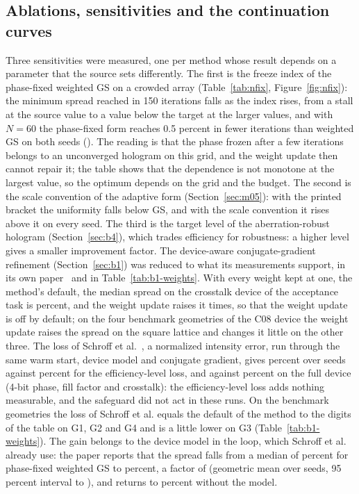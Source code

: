 \subsection{Ablations, sensitivities and the continuation curves}\label{sec:results-ablation}

Three sensitivities were measured, one per method whose result depends on a parameter that the source sets differently. The first is the freeze index of the phase-fixed weighted GS on a crowded array (Table~\ref{tab:nfix}, Figure~\ref{fig:nfix}): the minimum spread reached in 150 iterations falls as the index rises, from a stall at the source value to a value below the target at the larger values, and with $N=60$ the phase-fixed form reaches 0.5 percent in fewer iterations than weighted GS on both seeds (). The reading is that the phase frozen after a few iterations belongs to an unconverged hologram on this grid, and the weight update then cannot repair it; the table shows that the dependence is not monotone at the largest value, so the optimum depends on the grid and the budget. The second is the scale convention of the adaptive form (Section~\ref{sec:m05}): with the printed bracket the uniformity falls below GS, and with the scale convention it rises above it on every seed. The third is the target level of the aberration-robust hologram (Section~\ref{sec:b4}), which trades efficiency for robustness: a higher level gives a smaller improvement factor. The device-aware conjugate-gradient refinement (Section~\ref{sec:b1}) was reduced to what its measurements support, in its own paper~\cite{companion} and in Table~\ref{tab:b1-weights}. With every weight kept at one, the method's default, the median spread on the crosstalk device of the acceptance task is  percent, and the weight update raises it  times, so that the weight update is off by default; on the four benchmark geometries of the C08 device the weight update raises the spread on the square lattice and changes it little on the other three. The loss of Schroff et al.~\cite{schroff}, a normalized intensity error, run through the same warm start, device model and conjugate gradient, gives  percent over  seeds against  percent for the efficiency-level loss, and  against  percent on the full device (4-bit phase, fill factor and crosstalk): the efficiency-level loss adds nothing measurable, and the safeguard did not act in these runs. On the benchmark geometries the loss of Schroff et al. equals the default of the method to the digits of the table on G1, G2 and G4 and is a little lower on G3 (Table~\ref{tab:b1-weights}). The gain belongs to the device model in the loop, which Schroff et al. already use: the paper reports that the spread falls from a median of  percent for phase-fixed weighted GS to  percent, a factor of  (geometric mean over seeds, 95 percent interval  to ), and returns to  percent without the model.


